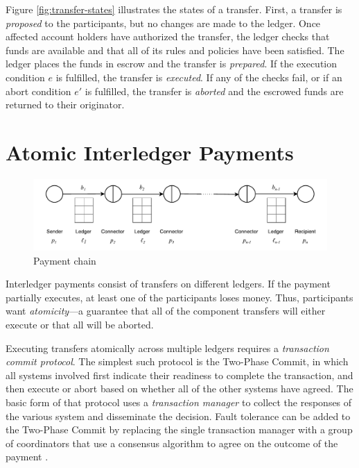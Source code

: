 \documentclass[letterpaper,twocolumn,10pt]{article}
\begin{document}
Figure \ref{fig:transfer-states} illustrates the states of a transfer. First, a transfer is \textit{proposed} to the participants, but no changes are made to the ledger. Once affected account holders have authorized the transfer, the ledger checks that funds are available and that all of its rules and policies have been satisfied. The ledger places the funds in escrow and the transfer is \textit{prepared}. If the execution condition $e$ is fulfilled, the transfer is \textit{executed}. If any of the checks fail, or if an abort condition $e'$ is fulfilled, the transfer is \textit{aborted} and the escrowed funds are returned to their originator.

\section{Atomic Interledger Payments}
\label{sec:atomic}

\begin{figure}[th!]
    \centering
    \includegraphics[width=\textwidth]{figures/payment-chain.pdf}
    \caption{Payment chain}
    \label{fig:n-bells}
\end{figure}

Interledger payments consist of transfers on different ledgers. If the payment partially executes, at least one of the participants loses money. Thus, participants want \textit{atomicity}---a guarantee that all of the component transfers will either execute or that all will be aborted.

Executing transfers atomically across multiple ledgers requires a \textit{transaction commit protocol}. The simplest such protocol is the Two-Phase Commit, in which all systems involved first indicate their readiness to complete the transaction, and then execute or abort based on whether all of the other systems have agreed. The basic form of that protocol uses a \textit{transaction manager} to collect the responses of the various system and disseminate the decision. Fault tolerance can be added to the Two-Phase Commit by replacing the single transaction manager with a group of coordinators that use a consensus algorithm to agree on the outcome of the payment \cite{gray2006consensus}.
\end{document}
